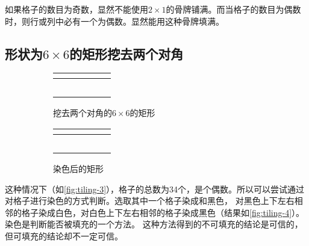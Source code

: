     如果格子的数目为奇数，显然不能使用$2\times1$的骨牌铺满。而当格子的数目为偶数时，则行或列中必有一个为偶数。显然能用这种骨牌填满。
\subsection{形状为$6\times6$的矩形挖去两个对角}\label{subsec:tiling-2-2}
    \begin{figure}[ht!]
        \begin{subfigure}{0.5\textwidth}
            \centering
            \begin{tabular}{|c|c|c|c|c|c|}
                \cline{2-6}
                \multicolumn{1}{c|}{}& & & & & \\ \hline
                & & & & & \\ \hline
                & & & & & \\ \hline
                & & & & & \\ \hline
                & & & & & \\ \hline
                & & & & &\multicolumn{1}{c}{} \\
                \cline{1-5}
            \end{tabular}
            \caption{挖去两个对角的$6\times6$的矩形}\label{fig:tiling-3}
        \end{subfigure}
        \begin{subfigure}{0.5\textwidth}
            \centering
            \begin{tabular}{|c|c|c|c|c|c|}
                \cline{2-6}
                \multicolumn{1}{c|}{}& \cellcolor[rgb]{0,0,0} & & \cellcolor[rgb]{0,0,0} & & \cellcolor[rgb]{0,0,0} \\ \hline
                 \cellcolor[rgb]{0,0,0} & & \cellcolor[rgb]{0,0,0} & & \cellcolor[rgb]{0,0,0} & \\ \hline
                 & \cellcolor[rgb]{0,0,0} & & \cellcolor[rgb]{0,0,0} & & \cellcolor[rgb]{0,0,0} \\ \hline
                 \cellcolor[rgb]{0,0,0} & & \cellcolor[rgb]{0,0,0} & & \cellcolor[rgb]{0,0,0} & \\ \hline
                 & \cellcolor[rgb]{0,0,0} & & \cellcolor[rgb]{0,0,0} & & \cellcolor[rgb]{0,0,0} \\ \hline
                 \cellcolor[rgb]{0,0,0} & & \cellcolor[rgb]{0,0,0} & & \cellcolor[rgb]{0,0,0} &\multicolumn{1}{c}{} \\
                \cline{1-5}
            \end{tabular}
            \caption{染色后的矩形}\label{fig:tiling-4}
        \end{subfigure}
        \caption{}
    \end{figure}
    这种情况下（如\autoref{fig:tiling-3}），格子的总数为34个，是个偶数。所以可以尝试通过对格子进行染色的方式判断。选取其中一个格子染成和黑色，
    对黑色上下左右相邻的格子染成白色，对白色上下左右相邻的格子染成黑色（结果如\autoref{fig:tiling-4}）。染色是判断能否被填充的一个方法。
    这种方法得到的不可填充的结论是可信的，但可填充的结论却不一定可信。

